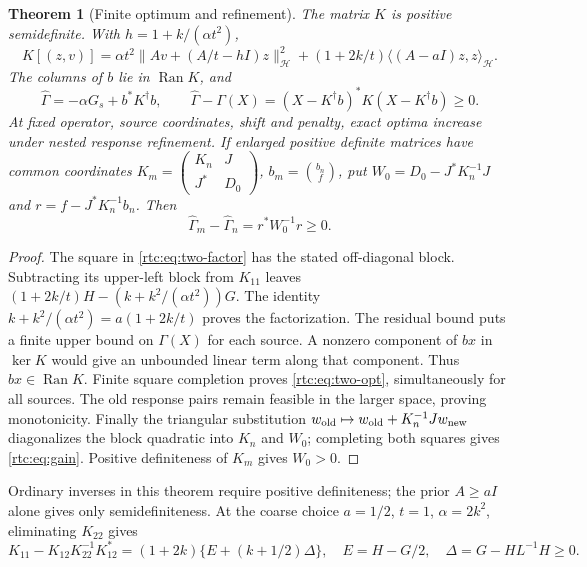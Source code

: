 \documentclass[11pt,a4paper]{article}
\numberwithin{equation}{section}
\newtheorem{theorem}{Theorem}[section]
\theoremstyle{definition}\newtheorem{definition}[theorem]{Definition}
\theoremstyle{remark}\newtheorem{remark}[theorem]{Remark}
\newcommand{\Hh}{\mathcal H}\newcommand{\Hw}{\mathcal H}
\newcommand{\ip}[2]{\langle#1,#2\rangle}\newcommand{\norm}[1]{\lVert#1\rVert}\newcommand{\abs}[1]{\lvert#1\rvert}
\begin{document}
\begin{theorem}[Finite optimum and refinement]\label{rtc:thm:opt}
The matrix $K$ is positive semidefinite. With $h=1+k/(\alpha t^2)$,
\begin{equation}\label{rtc:eq:two-factor}
 K[(z,v)]=\alpha t^2\norm{Av+(A/t-hI)z}_{\Hh}^2
 +(1+2k/t)\ip{(A-aI)z}{z}_{\Hh}.
\end{equation}
The columns of $b$ lie in $\operatorname{Ran}K$, and
\begin{equation}\label{rtc:eq:two-opt}
 \widehat\Gamma=-\alpha G_s+b^*K^\dagger b,\qquad
 \widehat\Gamma-\Gamma(X)=(X-K^\dagger b)^*K(X-K^\dagger b)\ge0.
\end{equation}
At fixed operator, source coordinates, shift and penalty, exact optima
increase under nested response refinement. If enlarged positive definite
matrices have common coordinates
$K_m=\left(\begin{smallmatrix}K_n&J\\J^*&D_0\end{smallmatrix}\right)$,
$b_m=\binom{b_n}{f}$, put
$W_0=D_0-J^*K_n^{-1}J$ and $r=f-J^*K_n^{-1}b_n$. Then
\begin{equation}\label{rtc:eq:gain}
 \widehat\Gamma_m-\widehat\Gamma_n=r^*W_0^{-1}r\ge0.
\end{equation}
\end{theorem}
\begin{proof}
The square in \eqref{rtc:eq:two-factor} has the stated off-diagonal
block. Subtracting its upper-left block from $K_{11}$ leaves
$(1+2k/t)H-(k+k^2/(\alpha t^2))G$.
The identity $k+k^2/(\alpha t^2)=a(1+2k/t)$ proves the factorization.
The residual bound puts a finite upper bound on $\Gamma(X)$ for each
source. A nonzero component of $bx$ in $\ker K$ would give an unbounded
linear term along that component. Thus $bx\in\operatorname{Ran}K$.
Finite square completion proves \eqref{rtc:eq:two-opt}, simultaneously
for all sources. The old response pairs remain feasible in the larger
space, proving monotonicity. Finally the triangular substitution
$w_{\rm old}\mapsto w_{\rm old}+K_n^{-1}Jw_{\rm new}$ diagonalizes
the block quadratic into $K_n$ and $W_0$; completing both squares gives
\eqref{rtc:eq:gain}. Positive definiteness of $K_m$ gives $W_0>0$.
\end{proof}
Ordinary inverses in this theorem require positive definiteness; the prior
$A\ge aI$ alone gives only semidefiniteness. At the coarse choice
$a=1/2$, $t=1$, $\alpha=2k^2$, eliminating $K_{22}$ gives
\begin{equation}\label{rtc:eq:reduced-hessian}
 K_{11}-K_{12}K_{22}^{-1}K_{12}^*
 =(1+2k)\{E+(k+1/2)\Delta\},\quad
 E=H-G/2,\quad\Delta=G-HL^{-1}H\ge0.
\end{equation}
\end{document}
